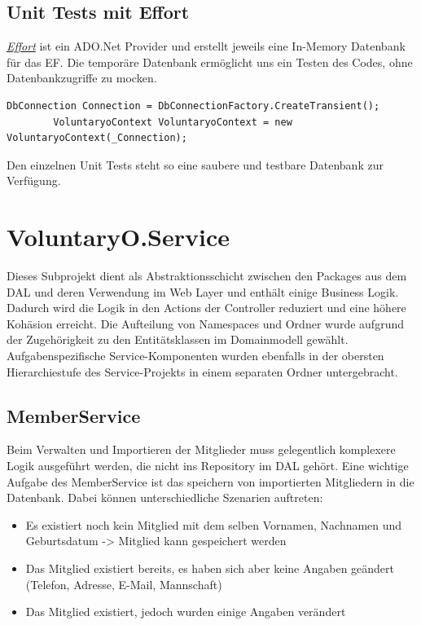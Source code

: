 	\subsection{Unit Tests mit Effort}
	\href{https://effort.codeplex.com/}{\textit{Effort}} ist ein ADO.Net Provider und erstellt jeweils eine In-Memory Datenbank für das EF. Die temporäre Datenbank ermöglicht uns ein Testen des Codes, ohne Datenbankzugriffe zu mocken.
	\begin{lstlisting}[language=CSharp, caption=Verwendung Effort für Unit Tests in EffortTest.cs, label=lst:effortunittest, firstnumber=1]
		DbConnection Connection = DbConnectionFactory.CreateTransient();
		VoluntaryoContext VoluntaryoContext = new VoluntaryoContext(_Connection);
    \end{lstlisting}
    Den einzelnen Unit Tests steht so eine saubere und testbare Datenbank zur Verfügung.


\section{VoluntaryO.Service}

Dieses Subprojekt dient als Abstraktionsschicht zwischen den Packages aus dem DAL und deren Verwendung im Web Layer und enthält einige Business Logik. Dadurch wird die Logik in den Actions der Controller reduziert und eine höhere Kohäsion erreicht. Die Aufteilung  von Namespaces und Ordner wurde aufgrund der Zugehörigkeit zu den Entitätsklassen im Domainmodell gewählt. Aufgabenspezifische Service-Komponenten wurden ebenfalls in der obersten Hierarchiestufe des Service-Projekts in einem separaten Ordner untergebracht.
	
	
	\subsection{MemberService}	
	Beim Verwalten und Importieren der Mitglieder muss gelegentlich komplexere Logik ausgeführt werden, die nicht ins Repository im DAL gehört.
	Eine wichtige Aufgabe des MemberService ist das speichern von importierten Mitgliedern in die Datenbank. Dabei können unterschiedliche Szenarien auftreten:
	\\\begin{itemize}	
		\item Es existiert noch kein Mitglied mit dem selben Vornamen, Nachnamen und Geburtsdatum -> Mitglied kann gespeichert werden
		\item Das Mitglied existiert bereits, es haben sich aber keine Angaben geändert (Telefon, Adresse, E-Mail, Mannschaft)
		\item Das Mitglied existiert, jedoch wurden einige Angaben verändert\\
	\end{itemize}
	
